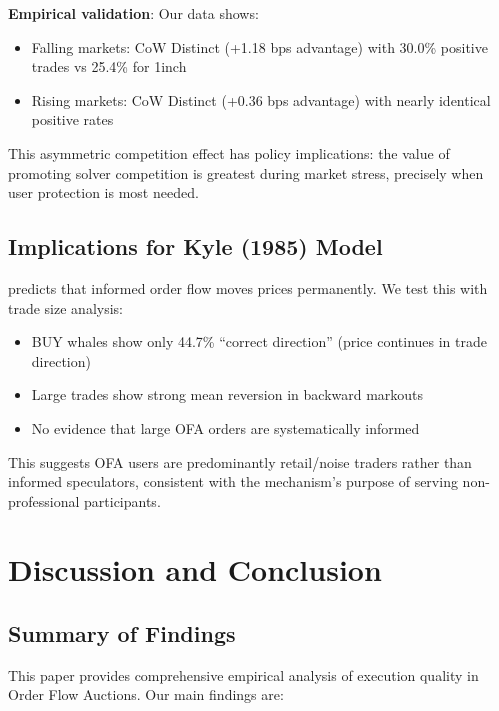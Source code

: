 \documentclass[12pt,a4paper]{article}
\begin{document}
\textbf{Empirical validation}: Our data shows:
\begin{itemize}
    \item Falling markets: CoW Distinct (+1.18 bps advantage) with 30.0\% positive trades vs 25.4\% for 1inch
    \item Rising markets: CoW Distinct (+0.36 bps advantage) with nearly identical positive rates
\end{itemize}

This asymmetric competition effect has policy implications: the value of promoting solver competition is greatest during market stress, precisely when user protection is most needed.

\subsection{Implications for Kyle (1985) Model}

\cite{kyle1985} predicts that informed order flow moves prices permanently. We test this with trade size analysis:

\begin{itemize}
    \item BUY whales show only 44.7\% ``correct direction'' (price continues in trade direction)
    \item Large trades show strong mean reversion in backward markouts
    \item No evidence that large OFA orders are systematically informed
\end{itemize}

This suggests OFA users are predominantly retail/noise traders rather than informed speculators, consistent with the mechanism's purpose of serving non-professional participants.

\section{Discussion and Conclusion}

\subsection{Summary of Findings}

This paper provides comprehensive empirical analysis of execution quality in Order Flow Auctions. Our main findings are:
\end{document}

